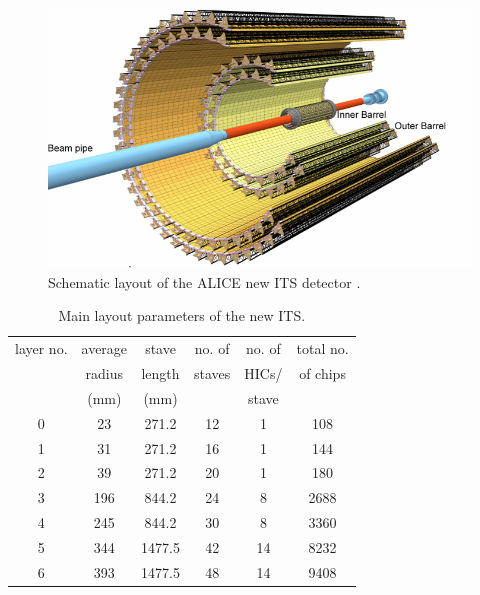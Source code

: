 \begin{figure}
\centering
\includegraphics[width=0.8\linewidth]{figures/SensorSimulation/Figure1.png}
\caption{Schematic layout of the ALICE new ITS detector \cite{ITS-TDR}.}
\label{fig:newITS}
\end{figure}

\begin{table}[H]
\centering
\begin{small} 
 \begin{tabular}{c|ccccc}
\hline
layer no. &	average&	stave&	no. of &no. of &total no.\\
&	radius&length&staves&HICs/	&of chips\\
&	(mm)&(mm)& &stave	&\\

\hline
0	&23 & 271.2 & 12 & 1&108\\
1	&31 & 271.2 & 16	& 1&144\\
2	&39 & 271.2 & 20	& 1&180\\
3	&196 & 844.2 & 24 & 8	&2688\\
4	&245 & 844.2 & 30 & 8	& 3360\\
5	&344 & 1477.5	&42 & 14 &	8232\\
6	&393 & 1477.5	& 48 & 14 &	9408\\

\hline
\end{tabular}
\caption{Main layout parameters of the new ITS. }
\label{tab-layout}
\end{small}
\end{table}



